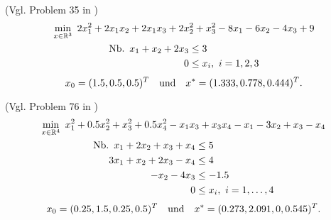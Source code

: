 \begin{testproblem}
(Vgl. Problem 35 in \cite[S.~58]{hock})
\begin{gather}
\min_{x\in\R^3}\ 2 x_1^2 + 2 x_1 x_2 + 2 x_1 x_3 + 2 x_2^2 + x_3^2 - 8 x_1 - 6 x_2 - 4 x_3 + 9 \notag \\
\begin{split}
\nb x_1 + x_2 + 2 x_3 & \leq 3 \\
0 & \leq x_i,\ i = 1,2,3 \\
\end{split}
\end{gather}
\begin{equation*}
x_0 = (1.5, 0.5, 0.5)^T \quad\text{und}\quad x^* = (1.333, 0.778, 0.444)^T.
\end{equation*}
\end{testproblem}

\begin{testproblem}
(Vgl. Problem 76 in \cite[S.~96]{hock})
\begin{gather}
\min_{x\in\R^4}\ x_1^2 + 0.5 x_2^2 + x_3^2 + 0.5 x_4^2 - x_1 x_3 + x_3 x_4 - x_1 - 3 x_2 + x_3 - x_4 \notag \\
\begin{split}
\nb x_1 + 2 x_2 + x_3 + x_4 & \leq 5 \\
3 x_1 + x_2 + 2 x_3 - x_4 & \leq 4 \\
-x_2 - 4 x_3 & \leq -1.5 \\
0 & \leq x_i,\ i = 1,\ldots,4 \\
\end{split}
\end{gather}
\begin{equation*}
x_0 = (0.25, 1.5, 0.25, 0.5)^T \quad\text{und}\quad x^* = (0.273, 2.091, 0, 0.545)^T.
\end{equation*}
\end{testproblem}
